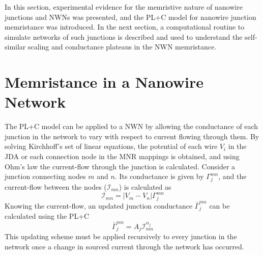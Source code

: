 In this section, experimental evidence for the memristive nature of nanowire junctions and NWNs was presented, and the PL+C model for nanowire junction memristance was introduced. In the next section, a computational routine to simulate networks of such junctions is described and used to understand the self-similar scaling and conductance plateaus in the NWN memristance.



\section{Memristance in a Nanowire Network}
\label{Sec: mrm_network}
The PL+C model can be applied to a NWN by allowing the conductance of each junction in the network to vary with respect to current flowing through them. By solving Kirchhoff's set of linear equations, the potential of each wire $V_i$ in the JDA or each connection node in the MNR mappings is obtained, and using Ohm's law the current-flow through the junction is calculated. Consider a junction connecting nodes $m$ and $n$. Its conductance is given by $\Gamma_j^{mn}$, and the current-flow between the nodes ($\mathcal{I}_{\textit{mn}}$) is calculated as
\begin{equation}
\mathcal{I}_{\textit{mn}} = | V_\textit{m} - V_\textit{n}| \Gamma_j^{\textit{mn}}
\label{eq: current_flow}
\end{equation}
Knowing the current-flow, an updated junction conductance $\bar{\Gamma}_j^{\textit{mn}}$ can be calculated using the PL+C
\begin{equation}
\bar{\Gamma}_j^{\textit{mn}} = A_j \mathcal{I}_{\textit{mn}} ^{\alpha_j}
\label{eq: junction_update}
\end{equation}
This updating scheme must be applied recursively to every junction in the network once a change in sourced current through the network has occurred.

